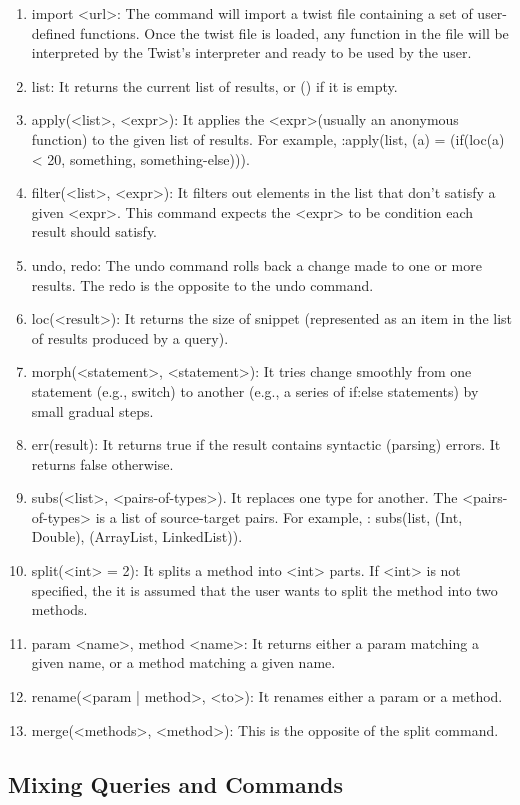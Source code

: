 \begin{enumerate}
	\item import <url>: The command will import a twist file containing a set of 
	user-defined functions. Once the twist file is loaded, any function in the file will 
	be interpreted by the Twist's interpreter and ready to be used by the user.
	\item list: It returns the current list of results, or () if it is empty.
	\item apply(<list>, <expr>): It applies the <expr>(usually an anonymous function) 
	to the given list of results. For example, :apply(list, (a) = (if(loc(a) < 20, 
	something, something-else))).
	\item filter(<list>, <expr>): It filters out elements in the list that don't satisfy 
	a given <expr>. This command expects the <expr> to be condition each result should 
	satisfy.
	\item undo, redo: The undo command rolls back a change made to one or more results. 
	The redo is the opposite to the undo command.  
	\item loc(<result>): It returns the size of snippet (represented as an item in the 
	list of results produced by a query).
	\item morph(<statement>, <statement>): It tries change smoothly from one statement 
	(e.g., switch) to another (e.g., a series of if:else statements) by small gradual 
	steps.
	\item err(result): It returns true if the result contains syntactic (parsing) errors. 
	It returns false otherwise.
	\item subs(<list>, <pairs-of-types>). It replaces one type for another. The 
	<pairs-of-types> is a list of source-target pairs. For example, : subs(list, (Int, 
	Double), (ArrayList, LinkedList)).
	\item split(<int> = 2): It splits a method into <int> parts. If <int> is not 
	specified, the it is assumed that the user wants to split the method into two methods.
	\item param <name>, method <name>: It returns either a param matching a given name, 
	or a method matching a given name.
	\item rename(<param | method>, <to>): It renames either a param or a method.
   \item merge(<methods>, <method>): This is the opposite of the split command.
\end{enumerate}

\subsection{Mixing Queries and Commands}
\label{sec:queriescommands}

